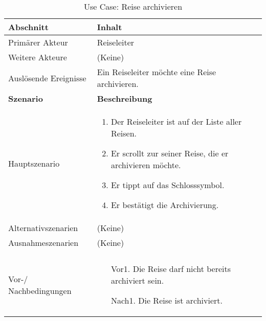 \begin{table}[H]
	\footnotesize
	\caption{Use Case: Reise archivieren}
	\begin{tabularx}{0.95\textwidth}{ |l|X| }
		\hline
		\rowcolor{gray} \textbf{Abschnitt}     & \textbf{Inhalt}                                              \\
		\hline
		Primärer Akteur                        & Reiseleiter                                                  \\
		\hline
		Weitere Akteure                        & (Keine)                                                      \\
		\hline
		Auslösende Ereignisse                  & Ein Reiseleiter möchte eine Reise archivieren.               \\

		\hline
		\rowcolor{lightgray} \textbf{Szenario} & \textbf{Beschreibung}                                        \\
		\hline
		Hauptszenario                          & \begin{enumerate}
			                                         \item Der Reiseleiter ist auf der Liste aller Reisen.
			                                         \item Er scrollt zur seiner Reise, die er archivieren möchte.
			                                         \item Er tippt auf das Schlosssymbol.
			                                         \item Er bestätigt die Archivierung.
		                                         \end{enumerate} \\
		\hline
		Alternativszenarien                    & (Keine)                                                      \\
		\hline
		Ausnahmeszenarien                      & (Keine)                                                      \\
		\hline
		\rowcolor{lightgray}                   &                                                              \\
		\hline
		Vor-/ Nachbedingungen                  & \begin{enumerate}
			                                         \item[Vor1.] Die Reise darf nicht bereits archiviert sein.
			                                         \item[Nach1.] Die Reise ist archiviert.
		                                         \end{enumerate}    \\
		\hline
	\end{tabularx}
\end{table}


